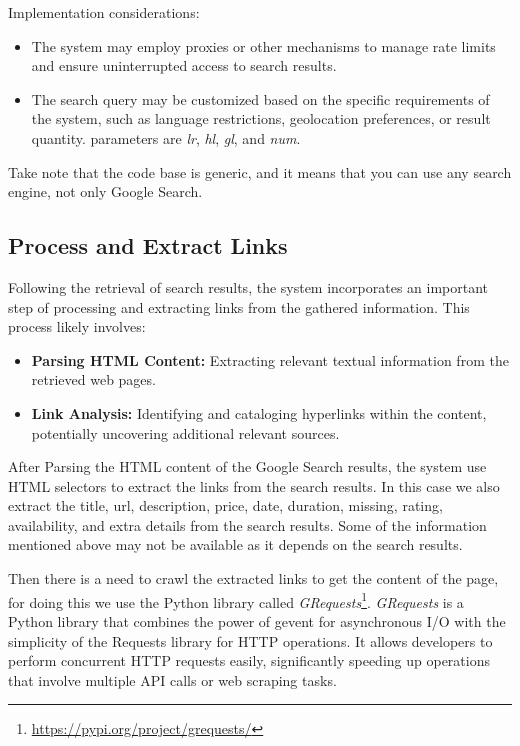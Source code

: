 Implementation considerations:
\begin{itemize}
    \item The system may employ proxies or other mechanisms to manage rate limits and ensure uninterrupted access to search results.
    \item The search query may be customized based on the specific requirements of the system, such as language restrictions, geolocation preferences, or result quantity. parameters are \textit{lr}, \textit{hl}, \textit{gl}, and \textit{num}.
\end{itemize}

Take note that the code base is generic, and it means that you can use any search engine, not only Google Search.

\subsection{Process and Extract Links}\label{subsec:process-and-extract-links}
Following the retrieval of search results, the system incorporates an important step of processing and extracting links from the gathered information.
This process likely involves:
\begin{itemize}
    \item \textbf{Parsing \ac{HTML} Content:} Extracting relevant textual information from the retrieved web pages.
    \item \textbf{Link Analysis:} Identifying and cataloging hyperlinks within the content, potentially uncovering additional relevant sources.
\end{itemize}

After Parsing the HTML content of the Google Search results, the system use HTML selectors to extract the links from the search results.
In this case we also extract the title, url, description, price, date, duration, missing, rating, availability, and extra details from the search results.
Some of the information mentioned above may not be available as it depends on the search results.

Then there is a need to crawl the extracted links to get the content of the page, for doing this we use the Python library called \textit{GRequests}\footnote{\url{https://pypi.org/project/grequests/}}.
\textit{GRequests} is a Python library that combines the power of gevent for asynchronous I/O with the simplicity of the Requests library for HTTP operations. It allows developers to perform concurrent HTTP requests easily, significantly speeding up operations that involve multiple API calls or web scraping tasks.

